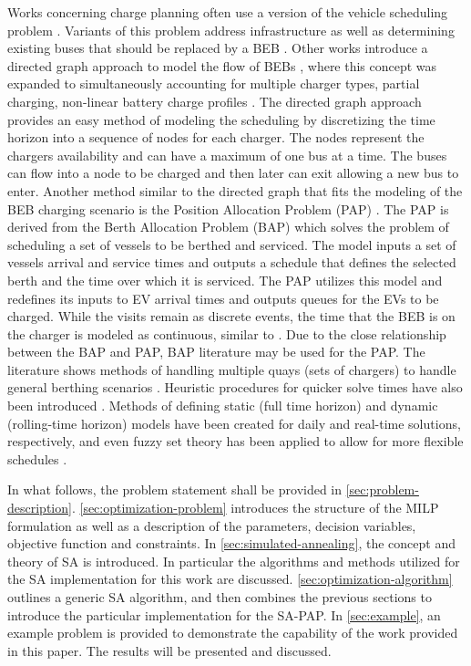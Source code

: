 \documentclass[11pt,a4paper,final]{article}
\begin{document}
Works concerning charge planning often use a version of the vehicle scheduling problem \cite{tang-2019-robus-sched,li-2014-trans-bus,he-2020-optim-charg}. Variants of this problem address infrastructure as well as determining
existing buses that should be replaced by a BEB \cite{zhou-2020-bi-objec,duan-2021-refor-mixed,rinaldi-2020-mixed-fleet,zhou-2020-collab-optim}. Other works introduce a directed graph approach to model the flow
of BEBs \cite{whitaker-2023-a-network,liu-2020-batter-elect}, where this concept was expanded to simultaneously
accounting for multiple charger types, partial charging, non-linear battery charge profiles
\cite{whitaker-2023-a-network}. The directed graph approach provides an easy method of modeling the scheduling by
discretizing the time horizon into a sequence of nodes for each charger. The nodes represent the chargers availability
and can have a maximum of one bus at a time. The buses can flow into a node to be charged and then later can exit
allowing a new bus to enter. Another method similar to the directed graph that fits the modeling of the BEB charging
scenario is the Position Allocation Problem (PAP) \cite{qarebagh-2019-optim-sched}. The PAP is derived from the Berth
Allocation Problem (BAP) which solves the problem of scheduling a set of vessels to be berthed and serviced. The model
inputs a set of vessels arrival and service times and outputs a schedule that defines the selected berth and the time
over which it is serviced. The PAP utilizes this model and redefines its inputs to EV arrival times and outputs queues
for the EVs to be charged. While the visits remain as discrete events, the time that the BEB is on the charger is
modeled as continuous, similar to \cite{frojan-2015-contin-berth,qarebagh-2019-optim-sched,zhou-2020-collab-optim}. Due to the close relationship between the BAP and PAP, BAP
literature may be used for the PAP. The literature shows methods of handling multiple quays (sets of chargers) to handle
general berthing scenarios \cite{frojan-2015-contin-berth,dai-2008-suppl-chain-analy}. Heuristic procedures for
quicker solve times have also been introduced \cite{imai-2001-dynam-berth}. Methods of defining static (full time
horizon) and dynamic (rolling-time horizon) models have been created for daily and real-time solutions, respectively,
and even fuzzy set theory has been applied to allow for more flexible schedules \cite{bello-2019-fuzzy-activ,dai-2008-suppl-chain-analy,buhrkal-2011-model-discr,frojan-2015-contin-berth}.

In what follows, the problem statement shall be provided in \ref{sec:problem-description}. \ref{sec:optimization-problem}
introduces the structure of the MILP formulation as well as a description of the parameters, decision variables,
objective function and constraints. In \ref{sec:simulated-annealing}, the concept and theory of SA is introduced. In
particular the algorithms and methods utilized for the SA implementation for this work are discussed.
\ref{sec:optimization-algorithm} outlines a generic SA algorithm, and then combines the previous sections to introduce the
particular implementation for the SA-PAP. In \ref{sec:example}, an example problem is provided to demonstrate the capability
of the work provided in this paper. The results will be presented and discussed.
\end{document}
